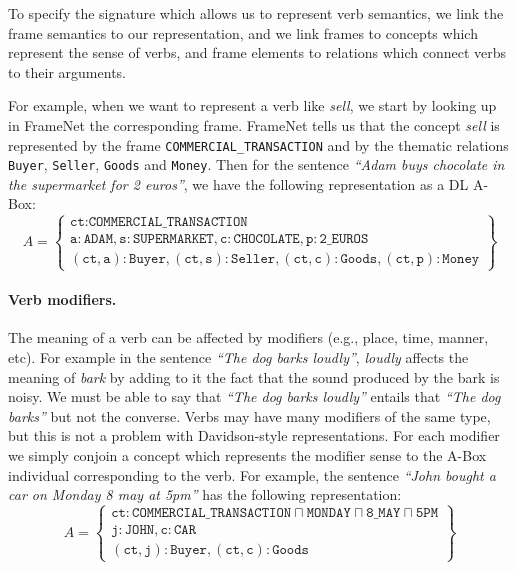\documentclass{esslli}
\newcommand{\dl}[1]{\texttt{#1}}
\newcommand{\dd}{{:}}
\begin{document}
To specify the signature which allows us to represent verb semantics,
we link the frame semantics to our representation, and we link frames
to concepts which represent the sense of verbs, and frame elements to
relations which connect verbs to their arguments.


For example, when we want to represent a verb like \emph{sell}, we start by looking up
in FrameNet the corresponding frame. FrameNet tells us that the
concept \emph{sell} is represented by the frame \dl{COMMERCIAL\_TRANSACTION} and
by the thematic relations \dl{Buyer}, \dl{Seller}, \dl{Goods} and
\dl{Money}. Then for the sentence \emph{``Adam buys chocolate in the
  supermarket for 2 euros''}, we have the following representation as
a DL A-Box:
$$
A = \left\{
\begin{array}{c}
\dl{ct} \dd \dl{COMMERCIAL\_TRANSACTION} \\
\dl{a} \dd \dl{ADAM}, \dl{s} \dd \dl{SUPERMARKET}, \dl{c} \dd \dl{CHOCOLATE}, \dl{p} \dd \dl{2\_EUROS} \\
(\dl{ct},\dl{a}) \dd \dl{Buyer}, (\dl{ct},\dl{s}) \dd \dl{Seller}, (\dl{ct},\dl{c}) \dd \dl{Goods}, (\dl{ct},\dl{p}) \dd \dl{Money}
\end{array}
\right\}$$
\vspace*{-.5cm}

\paragraph{Verb modifiers.}
The meaning of a verb can be affected by modifiers (e.g., place, time,
manner, etc). For example in the sentence \emph{``The dog barks
loudly''}, \emph{loudly} affects the meaning of \emph{bark} by adding
to it the fact that the sound produced by the bark is noisy. We must
be able to say that \emph{``The dog barks loudly''} entails that
\emph{``The dog barks''} but not the converse. Verbs may have many
modifiers of the same type, but this is not a problem with
Davidson-style representations. For each modifier we simply conjoin a
concept which represents the modifier sense to the A-Box individual
corresponding to the verb. For example, the sentence \emph{``John
bought a car on Monday 8 may at 5pm''} has the following representation:
$$
A = \left\{
\begin{array}{c}
\dl{ct} \dd \dl{COMMERCIAL\_TRANSACTION} \sqcap \dl{MONDAY} \sqcap \dl{8\_MAY} \sqcap \dl{5PM} \\
\dl{j} \dd \dl{JOHN}, \dl{c} \dd \dl{CAR} \\
(\dl{ct},\dl{j}) \dd \dl{Buyer}, (\dl{ct},\dl{c}) \dd \dl{Goods}
\end{array}
\right\}$$
\vspace*{-.5cm}
\end{document}
